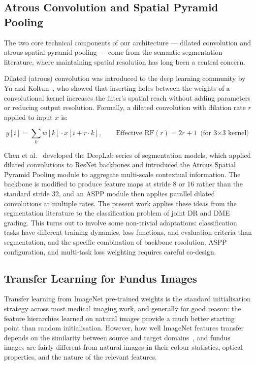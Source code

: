 \documentclass[12pt,a4paper]{article}
\begin{document}
\subsection{Atrous Convolution and Spatial Pyramid Pooling}

The two core technical components of our architecture --- dilated convolution and atrous spatial pyramid pooling --- come from the semantic segmentation literature, where maintaining spatial resolution has long been a central concern.

Dilated (atrous) convolution was introduced to the deep learning community by Yu and Koltun~\cite{Yu2015}, who showed that inserting holes between the weights of a convolutional kernel increases the filter's spatial reach without adding parameters or reducing output resolution. Formally, a dilated convolution with dilation rate $r$ applied to input $x$ is:

\begin{equation}
y[i] = \sum_k w[k] \cdot x[i + r \cdot k], \qquad \text{Effective RF}(r) = 2r + 1 \text{ (for 3$\times$3 kernel)}
\end{equation}

Chen et al.~\cite{Chen2017DeepLabV3, Chen2018DeepLabV3Plus} developed the DeepLab series of segmentation models, which applied dilated convolutions to ResNet backbones and introduced the Atrous Spatial Pyramid Pooling module to aggregate multi-scale contextual information. The backbone is modified to produce feature maps at stride 8 or 16 rather than the standard stride 32, and an ASPP module then applies parallel dilated convolutions at multiple rates.
\newpage
The present work applies these ideas from the segmentation literature to the classification problem of joint DR and DME grading. This turns out to involve some non-trivial adaptations: classification tasks have different training dynamics, loss functions, and evaluation criteria than segmentation, and the specific combination of backbone resolution, ASPP configuration, and multi-task loss weighting requires careful co-design.

\subsection{Transfer Learning for Fundus Images}

Transfer learning from ImageNet pre-trained weights is the standard initialisation strategy across most medical imaging work, and generally for good reason: the feature hierarchies learned on natural images provide a much better starting point than random initialisation. However, how well ImageNet features transfer depends on the similarity between source and target domains~\cite{Yosinski2014}, and fundus images are fairly different from natural images in their colour statistics, optical properties, and the nature of the relevant features.
\end{document}
